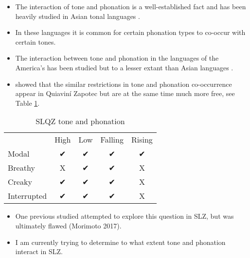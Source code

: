 \documentclass[12pt, letterpaper]{article}
\providecommand{\lsptoprule}{\midrule\toprule}
\providecommand{\lspbottomrule}{\bottomrule\midrule}
\begin{document}
\begin{itemize}
	\item The interaction of tone and phonation is a well-established fact and has been heavily studied in Asian tonal languages \citep[see references in][]{yipTone2002,michaudComplexTonesEast2012,brunelleTonePhonationSoutheast2016}.
	\item In these languages it is common for certain phonation types to co-occur with certain tones.
	\item The interaction between tone and phonation in the languages of the America's has been studied but to a lesser extant than Asian languages \citep{adlerAcousticsPhonationTypes2016,chavez-peonInteractionMetricalStructure2010,dicanioCoarticulationToneGlottal2012}. 
	\item \citet{chavez-peonInteractionMetricalStructure2010} showed that the similar restrictions in tone and phonation co-occurrence appear in Quiaviní Zapotec but are at the same time much more free, see Table \ref{tab:slqz}.
\end{itemize}

\begin{table}[!h]
\centering
\caption{SLQZ tone and phonation}
\label{tab:slqz}
 \begin{tabular}{lcccc}
  \lsptoprule
  				&	 High  & Low & Falling & Rising \\
  	Modal	& ✔︎ & ✔︎ & ✔︎ & ✔︎ \\
  	Breathy & X & ✔︎ & ✔︎ & X \\
  	Creaky & ✔︎ & ✔︎ & ✔︎ & X \\
  	Interrupted & ✔︎ & ✔︎ & ✔︎ & X \\
  \lspbottomrule
 \end{tabular}
\end{table}

\begin{itemize}
	\item One previous studied attempted to explore this question in SLZ, but was ultimately flawed (Morimoto 2017). 
	\item I am currently trying to determine to what extent tone and phonation interact in SLZ. 
\end{itemize}

\end{document}
